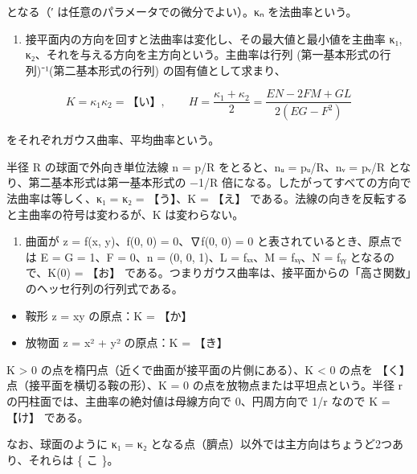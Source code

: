 \documentclass[
  10pt,
  a4paper,
]{article}
\providecommand{\tightlist}{%
  \setlength{\itemsep}{0pt}\setlength{\parskip}{0pt}}
\begin{document}
となる（′ は任意のパラメータでの微分でよい）。κ{\fallbackfont ₙ}
を法曲率という。

\begin{enumerate}
\def\labelenumi{(\arabic{enumi})}
\setcounter{enumi}{1}
\tightlist
\item
  接平面内の方向を回すと法曲率は変化し、その最大値と最小値を主曲率
  κ{\fallbackfont ₁},
  κ{\fallbackfont ₂}、それを与える方向を主方向という。主曲率は行列
  (第一基本形式の行列){\fallbackfont ⁻}¹(第二基本形式の行列)
  の固有値として求まり、
\end{enumerate}

\[K = \kappa_1 \kappa_2 = \text{【い】}, \qquad H = \frac{\kappa_1 + \kappa_2}{2} = \frac{EN - 2FM + GL}{2(EG - F^2)}\]

をそれぞれガウス曲率、平均曲率という。

半径 R の球面で外向き単位法線 n = p/R をとると、n{\fallbackfont ᵤ} =
p{\fallbackfont ᵤ}/R、n{\fallbackfont ᵥ} = p{\fallbackfont ᵥ}/R
となり、第二基本形式は第一基本形式の −1/R
倍になる。したがってすべての方向で法曲率は等しく、κ{\fallbackfont ₁} =
κ{\fallbackfont ₂} = 【う】、K = 【え】
である。法線の向きを反転すると主曲率の符号は変わるが、K は変わらない。

\begin{enumerate}
\def\labelenumi{(\arabic{enumi})}
\setcounter{enumi}{2}
\tightlist
\item
  曲面が z = f(x, y)、f(0, 0) = 0、∇f(0, 0) = 0
  と表されているとき、原点では E = G = 1、F = 0、n = (0, 0, 1)、L =
  f{\fallbackfont ₓₓ}、M = f{\fallbackfont ₓᵧ}、N = f{\fallbackfont ᵧᵧ}
  となるので、K(0) = 【お】
  である。つまりガウス曲率は、接平面からの「高さ関数」のヘッセ行列の行列式である。
\end{enumerate}

\begin{itemize}
\tightlist
\item
  鞍形 z = xy の原点：K = 【か】
\item
  放物面 z = x² + y² の原点：K = 【き】
\end{itemize}

K \textgreater{} 0 の点を楕円点（近くで曲面が接平面の片側にある）、K
\textless{} 0 の点を 【く】 点（接平面を横切る鞍の形）、K = 0
の点を放物点または平坦点という。半径 r
の円柱面では、主曲率の絶対値は母線方向で 0、円周方向で 1/r なので K =
【け】 である。

なお、球面のように κ{\fallbackfont ₁} = κ{\fallbackfont ₂}
となる点（臍点）以外では主方向はちょうど2つあり、それらは \{ こ \}。
\end{document}

